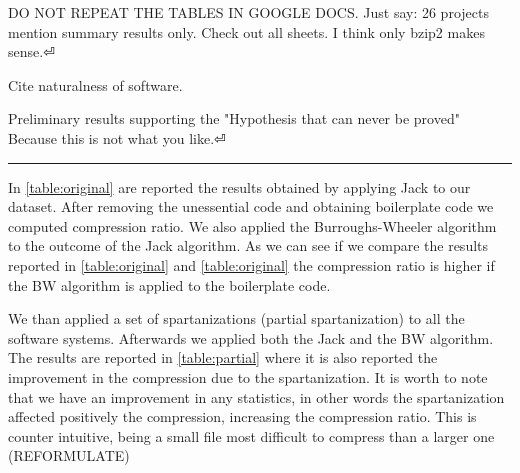 DO NOT REPEAT THE TABLES IN GOOGLE DOCS.
Just say: 26 projects mention summary results only.
Check out all sheets. I think only bzip2 makes sense.⏎

Cite naturalness of software.

Preliminary results supporting the
"Hypothesis that can never be proved"
Because this is not what you like.⏎

\hrule

In \cref{table:original} are reported the results obtained by applying Jack to
our dataset. After removing the unessential code and obtaining boilerplate
code we computed compression ratio. We also applied the Burroughs-Wheeler
algorithm to the outcome of the Jack algorithm. As we can see if we compare
the results reported in \cref{table:original} and \cref{table:original} the
compression ratio is higher if the BW algorithm is applied to the boilerplate
code.

\begin{table}
  \centering
  \label{table:original}
  \caption{The results of the compression using the Jack algorithm alone and both Jack and
  Burroughs-Wheeler algorithms combined.}
\end{table}

We than applied a set of spartanizations (partial spartanization) to all the
software systems. Afterwards we applied both the Jack and the BW algorithm.
The results are reported in \cref{table:partial} where it is also
reported the improvement in the compression due to the spartanization. It is
worth to note that we have an improvement in any statistics, in other words the
spartanization affected positively the compression, increasing the compression
ratio. This is counter intuitive, being a small file most difficult to
compress than a larger one (REFORMULATE)

